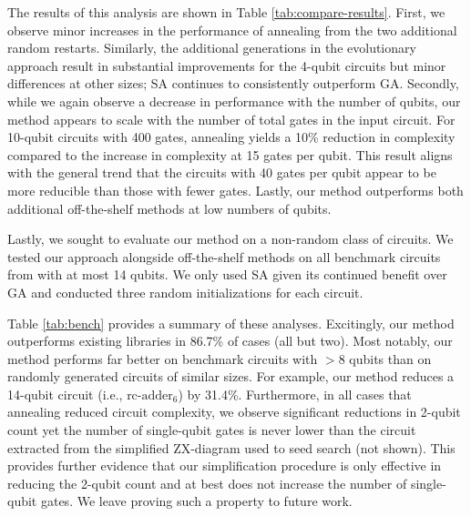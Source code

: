 The results of this analysis are shown in Table \ref{tab:compare-results}.
First, we observe minor increases in the performance of annealing from the two additional random restarts.
Similarly, the additional generations in the evolutionary approach result in substantial improvements for the 4-qubit circuits but minor differences at other sizes;
SA continues to consistently outperform GA.
Secondly, while we again observe a decrease in performance with the number of qubits, our method appears to scale with the number of total gates in the input circuit.
For 10-qubit circuits with 400 gates, annealing yields a 10\% reduction in complexity compared to the increase in complexity at 15 gates per qubit.
This result aligns with the general trend that the circuits with 40 gates per qubit appear to be more reducible than those with fewer gates.
Lastly, our method outperforms both additional off-the-shelf methods at low numbers of qubits.

Lastly, we sought to evaluate our method on a non-random class of circuits.
We tested our approach alongside off-the-shelf methods on all benchmark circuits from \cite{kissinger2019reducing} with at most 14 qubits.
We only used SA given its continued benefit over GA and conducted three random initializations for each circuit.

Table \ref{tab:bench} provides a summary of these analyses.
Excitingly, our method outperforms existing libraries in 86.7\% of cases (all but two).
Most notably, our method performs far better on benchmark circuits with $>8$ qubits than on randomly generated circuits of similar sizes.
For example, our method reduces a 14-qubit circuit (i.e., $\text{rc-adder}_6$) by 31.4\%.
Furthermore, in all cases that annealing reduced circuit complexity, we observe significant reductions in 2-qubit count yet the number of single-qubit gates is never lower than the circuit extracted from the simplified ZX-diagram used to seed search (not shown).
This provides further evidence that our simplification procedure is only effective in reducing the 2-qubit count and at best does not increase the number of single-qubit gates.
We leave proving such a property to future work.


